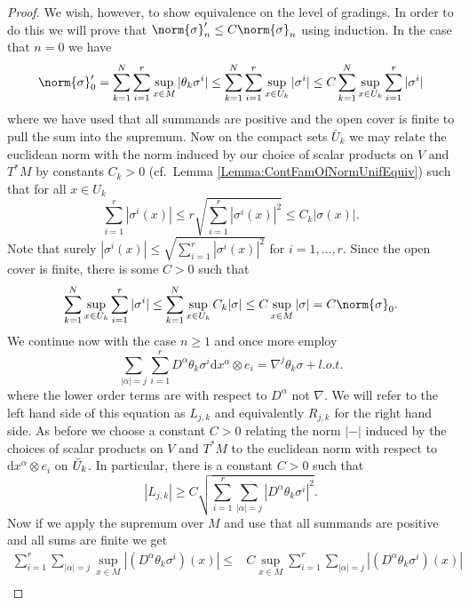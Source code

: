 \documentclass[12pt,a4paper]{article}
\theoremstyle{plain}
\theoremstyle{definition}
\newcommand{\nnorm}[2]{\norm{#1}_{#2}}
\newcommand{\tens}{\otimes}
\renewcommand{\d}{\mathrm{d}}
\begin{document}
\begin{appendices}
\begin{proof}
We wish, however, to show equivalence on the level of gradings. In order to do this we will prove that $\nnorm{\sigma}{n}'\leq C\nnorm{\sigma}{n}$ using induction. In the case that $n=0$ we have
\begin{equation*}
    \nnorm{\sigma}{0}'=\sum_{k=1}^N\sum_{i=1}^r\sup_{x\in M}|\theta_k\sigma^i|\leq \sum_{k=1}^N\sum_{i=1}^r \sup_{x\in U_k}|\sigma^i|\leq C \sum_{k=1}^N \sup_{x\in U_k}\sum_{i=1}^r|\sigma^i|
\end{equation*}
where we have used that all summands are positive and the open cover is finite to pull the sum into the supremum.
Now on the compact sets $\bar U_k$ we may relate the euclidean norm with the norm induced by our choice of scalar products on $V$ and $T^*M$ by constants $C_k>0$ (cf.~Lemma \ref{Lemma:ContFamOfNormUnifEquiv}) such that for all $x\in U_k$
\begin{equation*}
    \sum_{i=1}^r|\sigma^i(x)|\leq r \sqrt{\sum_{i=1}^r |\sigma^i(x)|^2}\leq C_k|\sigma(x)|.
\end{equation*}
Note that surely $|\sigma^i(x)|\leq \sqrt{\sum_{i=1}^r |\sigma^i(x)|^2}$ for $i=1,\ldots,r$.
Since the open cover is finite, there is some $C>0$ such that
\begin{equation*}
    \sum_{k=1}^N \sup_{x\in U_k}\sum_{i=1}^r |\sigma^i|\leq \sum_{k=1}^N\sup_{x\in U_k}C_k|\sigma|\leq C \sup_{x\in M}|\sigma|= C\nnorm{\sigma}{0}.
\end{equation*}
We continue now with the case $n\geq1$ and once more employ
\begin{equation*}
    \sum_{|\alpha|=j}\sum_{i=1}^rD^{\alpha}\theta_k\sigma^i\d x^{\alpha}\tens e_i = \nabla^j\theta_k\sigma + l.o.t.
\end{equation*}
where the lower order terms are with respect to $D^\alpha$ not $\nabla$. We will refer to the left hand side of this equation as $L_{j,k}$ and equivalently $R_{j,k}$ for the right hand side. As before we choose a constant $C>0$ relating the norm $|-|$ induced by the choices of scalar products on $V$ and $T^*M$ to the euclidean norm with respect to $\d x^{\alpha}\tens e_i$ on $\Bar{U}_k$. In particular, there is a constant $C>0$ such that
\begin{equation*}
    |L_{j,k}|\geq C \sqrt{\sum_{i=1}^r\sum_{|\alpha|=j}|D^{\alpha}\theta_k\sigma^i|^2}.
\end{equation*}
Now if we apply the supremum over $M$ and use that all summands are positive and all sums are finite we get
\begin{align*}
    \sum_{i=1}^r\sum_{|\alpha|=j}\sup_{x\in M}|(D^{\alpha}\theta_k\sigma^i)(x)|\leq& C\sup_{x\in M}  \sum_{i=1}^r\sum_{|\alpha|=j} |(D^{\alpha}\theta_k\sigma^i)(x)|\\

\end{align*}
\end{proof}
\end{appendices}
\end{document}
